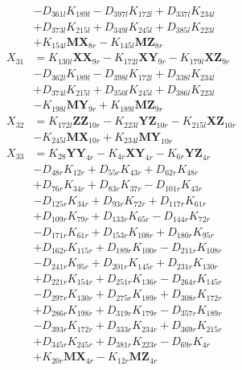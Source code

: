 \begin{multicols}{2}
\begin{align}
&- D_{361l}K_{189l} - D_{397l}K_{172l} + D_{337l}K_{234l}  \nonumber \\
&+ D_{373l}K_{215l} + D_{349l}K_{245l} + D_{385l}K_{223l}  \nonumber \\
&+ K_{154l}\mathbf{MX}_{8r} - K_{145l}\mathbf{MZ}_{8r} \nonumber \\
X_{31} &= K_{130l}\mathbf{XX}_{9r} - K_{172l}\mathbf{XY}_{9r} - K_{179l}\mathbf{XZ}_{9r}  \nonumber \\
&- D_{362l}K_{189l} - D_{398l}K_{172l} + D_{338l}K_{234l}  \nonumber \\
&+ D_{374l}K_{215l} + D_{350l}K_{245l} + D_{386l}K_{223l}  \nonumber \\
&- K_{198l}\mathbf{MY}_{9r} + K_{189l}\mathbf{MZ}_{9r} \nonumber \\
X_{32} &= K_{172l}\mathbf{ZZ}_{10r} - K_{223l}\mathbf{YZ}_{10r} - K_{215l}\mathbf{XZ}_{10r}  \nonumber \\
&- K_{245l}\mathbf{MX}_{10r} + K_{234l}\mathbf{MY}_{10r} \nonumber \\
X_{33} &= K_{28}\mathbf{YY}_{4r} - K_{4r}\mathbf{XY}_{4r} - K_{6r}\mathbf{YZ}_{4r}  \nonumber \\
&- D_{48r}K_{12r} + D_{55r}K_{43r} + D_{62r}K_{48r}  \nonumber \\
&+ D_{76r}K_{34r} + D_{83r}K_{37r} - D_{101r}K_{43r}  \nonumber \\
&- D_{125r}K_{34r} + D_{93r}K_{72r} + D_{117r}K_{61r}  \nonumber \\
&+ D_{109r}K_{79r} + D_{133r}K_{65r} - D_{144r}K_{72r}  \nonumber \\
&- D_{171r}K_{61r} + D_{153r}K_{108r} + D_{180r}K_{95r}  \nonumber \\
&+ D_{162r}K_{115r} + D_{189r}K_{100r} - D_{211r}K_{108r}  \nonumber \\
&- D_{241r}K_{95r} + D_{201r}K_{145r} + D_{231r}K_{130r}  \nonumber \\
&+ D_{221r}K_{154r} + D_{251r}K_{136r} - D_{264r}K_{145r}  \nonumber \\
&- D_{297r}K_{130r} + D_{275r}K_{189r} + D_{308r}K_{172r}  \nonumber \\
&+ D_{286r}K_{198r} + D_{319r}K_{179r} - D_{357r}K_{189r}  \nonumber \\
&- D_{393r}K_{172r} + D_{333r}K_{234r} + D_{369r}K_{215r}  \nonumber \\
&+ D_{345r}K_{245r} + D_{381r}K_{223r} - D_{69r}K_{4r}  \nonumber \\
&+ K_{20r}\mathbf{MX}_{4r} - K_{12r}\mathbf{MZ}_{4r} \nonumber \\

\end{align}
\end{multicols}
